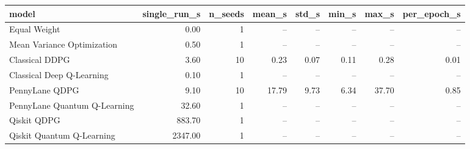\begin{tabular}{lrrrrrrr}
\toprule
model & single_run_s & n_seeds & mean_s & std_s & min_s & max_s & per_epoch_s \\
\midrule
Equal Weight & 0.00 & 1 & -- & -- & -- & -- & -- \\
Mean Variance Optimization & 0.50 & 1 & -- & -- & -- & -- & -- \\
Classical DDPG & 3.60 & 10 & 0.23 & 0.07 & 0.11 & 0.28 & 0.01 \\
Classical Deep Q-Learning & 0.10 & 1 & -- & -- & -- & -- & -- \\
PennyLane QDPG & 9.10 & 10 & 17.79 & 9.73 & 6.34 & 37.70 & 0.85 \\
PennyLane Quantum Q-Learning & 32.60 & 1 & -- & -- & -- & -- & -- \\
Qiskit QDPG & 883.70 & 1 & -- & -- & -- & -- & -- \\
Qiskit Quantum Q-Learning & 2347.00 & 1 & -- & -- & -- & -- & -- \\
\bottomrule
\end{tabular}
